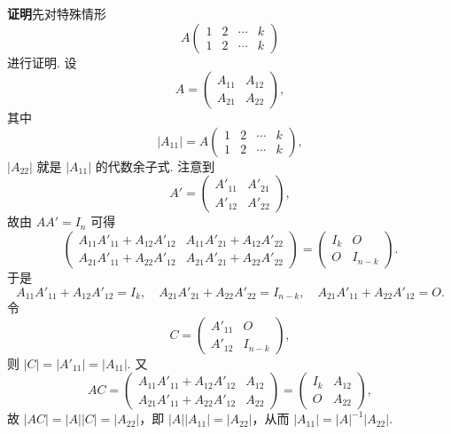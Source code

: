 \documentclass[UTF8,12pt,a4paper,fontset=fandol]{ctexart}
\begin{document}
\noindent\textbf{证明}\quad 先对特殊情形
\[
A\begin{pmatrix}
1&2&\cdots&k\\
1&2&\cdots&k
\end{pmatrix}
\]
进行证明. 设
\[
A=\begin{pmatrix}
A_{11}&A_{12}\\
A_{21}&A_{22}
\end{pmatrix},
\]
其中
\[
|A_{11}|=A\begin{pmatrix}
1&2&\cdots&k\\
1&2&\cdots&k
\end{pmatrix},
\]
$|A_{22}|$ 就是 $|A_{11}|$ 的代数余子式. 注意到
\[
A'=\begin{pmatrix}
A'_{11}&A'_{21}\\
A'_{12}&A'_{22}
\end{pmatrix},
\]
故由 $AA'=I_n$ 可得
\[
\begin{pmatrix}
A_{11}A'_{11}+A_{12}A'_{12}&A_{11}A'_{21}+A_{12}A'_{22}\\
A_{21}A'_{11}+A_{22}A'_{12}&A_{21}A'_{21}+A_{22}A'_{22}
\end{pmatrix}
=
\begin{pmatrix}
I_k&O\\
O&I_{n-k}
\end{pmatrix}.
\]
于是
\[
A_{11}A'_{11}+A_{12}A'_{12}=I_k,\quad
A_{21}A'_{21}+A_{22}A'_{22}=I_{n-k},\quad
A_{21}A'_{11}+A_{22}A'_{12}=O.
\]
令
\[
C=\begin{pmatrix}
A'_{11}&O\\
A'_{12}&I_{n-k}
\end{pmatrix},
\]
则 $|C|=|A'_{11}|=|A_{11}|$. 又
\[
AC=
\begin{pmatrix}
A_{11}A'_{11}+A_{12}A'_{12}&A_{12}\\
A_{21}A'_{11}+A_{22}A'_{12}&A_{22}
\end{pmatrix}
=
\begin{pmatrix}
I_k&A_{12}\\
O&A_{22}
\end{pmatrix},
\]
故 $|AC|=|A||C|=|A_{22}|$，即 $|A||A_{11}|=|A_{22}|$，从而 $|A_{11}|=|A|^{-1}|A_{22}|$.
\end{document}

